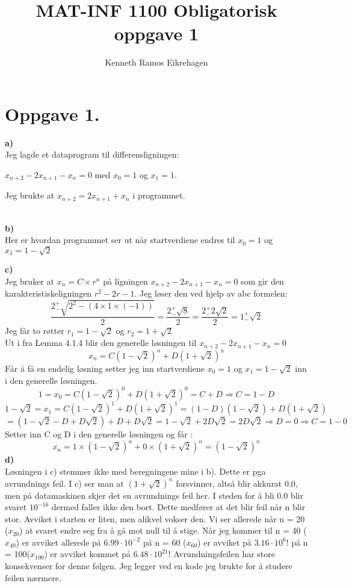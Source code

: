 \documentclass[,norsk]{article}
\title{MAT-INF 1100 Obligatorisk oppgave 1}
\author{Kenneth Ramos Eikrehagen}
\begin{document}
\maketitle
\tableofcontents
\section{Oppgave 1.} 
\textbf{a)}\\
Jeg lagde et dataprogram til differensligningen: 

$x_{n+2} - 2 x_{n+1} - x_{n} = 0$ med  $x_0 = 1$ og $x_1 = 1$.

Jeg brukte at  $x_{n+2} = 2x_{n+1} + x_n$ i programmet.

\\
\textbf{b)}\\
Her er hvordan programmet ser ut når startverdiene endres til $x_0 =
1$ og $x_1 = 1 - \sqrt2$

\textbf{c)} \\ 
Jeg bruker at $x_n=C\times r^n$ på ligningen $x_{n+2} - 2 x_{n+1} - x_{n} =0$ som gir den karakteristiskeligningen $r^2-2r-1$. Jeg løser den ved hjelp av abc formelen:
\begin{equation}
\frac{2_-^+\sqrt{2^2-(4\times1\times(-1))}}{2} =\frac{2_-^+\sqrt8}{2} = \frac{2_-^+2\sqrt2}{2} =
1_-^+\sqrt2
\end{equation}
Jeg får to røtter $r_1=1-\sqrt2$ og $r_2=1+\sqrt2$ \\
Ut i fra Lemma 4.1.4 blir den generelle løsningen til $x_{n+2} - 2 x_{n+1} - x_{n} =0$ $$x_n = C(1-\sqrt 2)^n + D(1+\sqrt2)^n$$ 
Får å få en endelig løsning setter jeg inn startverdiene $x_0=1$ og $x_1=1-\sqrt2$ inn i den
generelle løsningen. $$1 = x_0 = C(1-\sqrt2)^0 + D(1+\sqrt2)^0 = C +
D\Rightarrow C = 1 -D$$
$$1-\sqrt2 = x_1 = C(1-\sqrt2)^1 + D(1+\sqrt2)^1 = (1-D)(1-\sqrt2) +
D(1+\sqrt2)$$ $$= (1 - \sqrt2 - D +D\sqrt2) + D + D\sqrt2 = 1 -\sqrt2 +
2D\sqrt2 = 2D\sqrt2 \Rightarrow D = 0 \Rightarrow C =1 - 0$$
Setter inn C og D i den generelle løsningen og får :
$$x_n = 1\times(1-\sqrt 2)^n + 0\times(1+\sqrt2)^n = (1 - \sqrt2)^n$$
\textbf{d)}\\
Løsningen i c) stemmer ikke med beregningene mine i b). Dette er pga
avrundnings feil.  I c) ser man at $(1+\sqrt2)^n$ forsvinner, altså
blir akkurat 0.0, men på datamaskinen skjer det en avrundnings feil
her. I steden for å bli 0.0 blir svaret $10^{-16}$ dermed faller
ikke den bort. Dette medfører at det blir feil når n blir stor.
Avviket i starten er liten, men alikvel vokser den. Vi ser
allerede når n = 20 ($x_{20}$) at svaret endre seg fra å gå mot null
til å stige. Når jeg kommer til n = 40 ($x_{40}$) er avviket allerede på
$6.99\cdot 10^{-2}$ på n = 60 ($x_{60}$) er avviket på $3.16\cdot 10^6$! på
n = 100($x_{100}$) er avviket kommet på $6.48\cdot 10^{21}$! Avrundningsfeilen
har store konsekvenser for denne følgen. Jeg legger ved en kode jeg brukte for å studere feilen nærmere.

\end{document}
